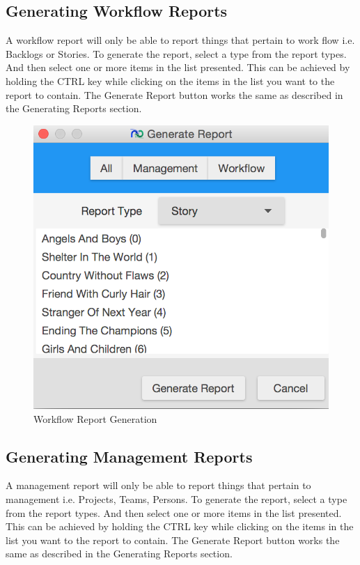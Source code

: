 \subsection{Generating Workflow Reports}

A workflow report will only be able to report things that pertain to work flow i.e. Backlogs or Stories. To generate the report, select a type from the report types. And then select one or more items in the list presented. This can be achieved by holding the CTRL key while clicking on the items in the list you want to the report to contain. The Generate Report button works the same as described in the Generating Reports section.

\begin{figure}[H]
\centering
\includegraphics[width=\textwidth]{images/screenshots/report3.PNG}
\caption{Workflow Report Generation}
\label{fig:generate_report_workflow}
\end{figure}

\subsection{Generating Management Reports}

A management report will only be able to report things that pertain to management i.e. Projects, Teams, Persons. To generate the report, select a type from the report types. And then select one or more items in the list presented. This can be achieved by holding the CTRL key while clicking on the items in the list you want to the report to contain. The Generate Report button works the same as described in the Generating Reports section.

